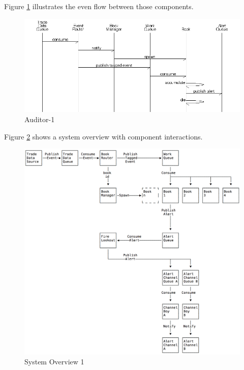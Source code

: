 \documentclass[captions=tableheading]{scrreprt}
\begin{document}
Figure \ref{fig:orgparagraph2} illustrates the even flow between those components.


\begin{figure}[htb]
\centering
\includegraphics[width=14 cm]{Auditor-1.png}
\caption{\label{fig:orgparagraph2}
Auditor-1}
\end{figure}

Figure \ref{fig:orgparagraph3} shows a system overview with component
interactions.

\begin{figure}[htb]
\centering
\includegraphics[width=.9\linewidth]{system-overview-1.png}
\caption{\label{fig:orgparagraph3}
System Overview 1}
\end{figure}
\end{document}
